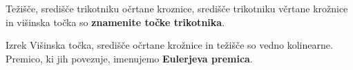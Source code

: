         \begin{frame}

            \begin{block}{}
                Težišče, središče trikotniku očrtane kroznice, središče trikotniku včrtane krožnice in višinska točka so \textbf{znamenite točke trikotnika}.
            \end{block}

            
            \begin{block}{Izrek}
                Višinska točka, središče očrtane krožnice in težišče so vedno kolinearne. Premico, ki jih povezuje, imenujemo \textbf{Eulerjeva premica}.


                \begin{figure}
\end{figure}
\end{block}
\end{frame}
